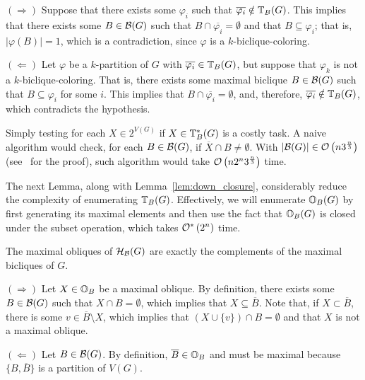 \begin{tproof}
$(\Rightarrow)$ Suppose that there exists some $\varphi_i$ such that $\overline{\varphi_i} \notin \mathbb{T}_{B}(G)$.
This implies that there exists some $B \in \mathcal{B}(G)$ such that $B \cap \overline{\varphi_i} = \emptyset$ and that $B \subseteq \varphi_i$; that is, $|\varphi(B)| = 1$, which is a contradiction, since $\varphi$ is a $k$-biclique-coloring.

$(\Leftarrow)$ Let $\varphi$ be a $k$-partition of $G$ with $\overline{\varphi_i} \in \mathbb{T}_{B}(G)$, but suppose that $\varphi_k$ is not a $k$-biclique-coloring.
That is, there exists some maximal biclique $B \in \mathcal{B}(G)$ such that $B \subseteq \varphi_i$ for some $i$.
This implies that $B \cap \overline{\varphi_i} = \emptyset$, and, therefore, $\overline{\varphi_i} \notin \mathbb{T}_{B}(G)$, which contradicts the hypothesis.
\end{tproof}

Simply testing for each $X \in 2^{V(G)}$ if $X \in \mathbb{T}^*_{B}(G)$ is a costly task.
A naive algorithm would check, for each $B \in \mathcal{B}(G)$, if $\overline{X} \cap B \neq \emptyset$.
With $|\mathcal{B}(G)| \in \mathcal{O}\left(n3^{\frac{n}{3}}\right)$ (see~\citep{gaspers} for the proof), such algorithm would take $\mathcal{O}\left(n2^n3^{\frac{n}{3}}\right)$ time.

The next Lemma, along with Lemma~\ref{lem:down_closure}, considerably reduce the complexity of enumerating $\mathbb{T}_{B}(G)$.
Effectively, we will enumerate $\mathbb{O}_{B}(G)$ by first generating its maximal elements and then use the fact that $\mathbb{O}_{B}(G)$ is closed under the subset operation, which takes $\mathcal{O}^*\left(2^n\right)$ time.

\begin{lemma}
    \label{lem:complementary_obliques}
    The maximal obliques of $\mathcal{H}_{\mathcal{B}}(G)$ are exactly the complements of the maximal bicliques of $G$.
\end{lemma}

\begin{tproof}
    $(\Rightarrow)$ Let $X \in \mathbb{O}_{B}$ be a maximal oblique. By definition, there exists some $B \in \mathcal{B}(G)$ such that $X \cap B = \emptyset$, which implies that $X \subseteq \overline{B}$.
    Note that, if $X \subset \overline{B}$, there is some $v \in \overline{B} \setminus X$, which implies that $(X \cup \{v\}) \cap B = \emptyset$ and that $X$ is not a maximal oblique.
    
    $(\Leftarrow)$ Let $B \in \mathcal{B}(G)$. By definition, $\overline{B} \in \mathbb{O}_{B}$ and must be maximal because $\{B, \overline{B}\}$ is a partition of $V(G)$.
\end{tproof}

